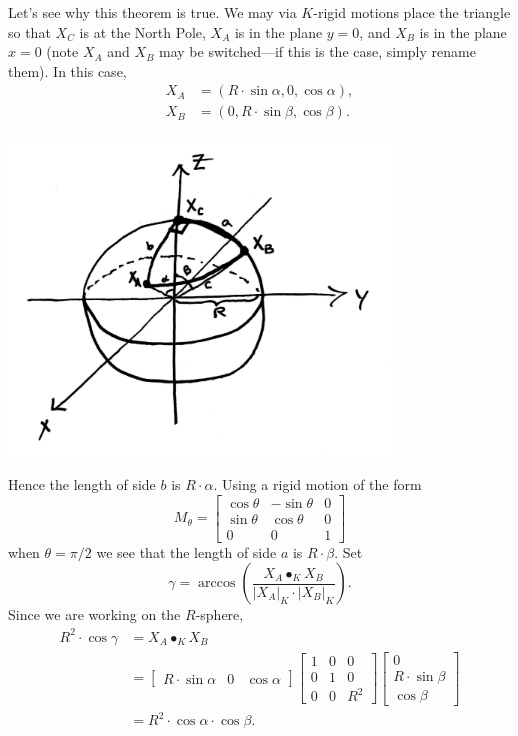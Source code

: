 \documentclass[newpage,hints,handout]{ximera}
\begin{document}
Let's see why this theorem is true.  We may via $K$-rigid motions
place the triangle so that $X_C$ is at the North Pole, $X_A$ is in the
plane $y=0$, and $X_B$ is in the plane $x=0$ (note $X_A$ and $X_B$ may
be switched---if this is the case, simply rename them). In this case,
\begin{align*}
  X_A &= (R\cdot \sin\alpha, 0, \cos\alpha),\\
  X_B &= (0, R\cdot \sin \beta, \cos\beta).
\end{align*}
\begin{image}
  \includegraphics[width=4in]{sphPythag.png}
\end{image}
Hence the length of side $b$ is $R\cdot\alpha$. Using a rigid motion of the form
\[
M_\theta=
\begin{bmatrix}
  \cos\theta & -\sin\theta & 0\\
  \sin\theta & \cos\theta & 0\\
  0 & 0 & 1
\end{bmatrix}
\]
when $\theta = \pi/2$ we see that the length of side $a$ is $R\cdot
\beta$. Set
\[
\gamma = \arccos\left(\frac{X_A\bullet_K X_B}{|X_A|_K\cdot |X_B|_K}\right).
\]
Since we are working on the $R$-sphere,
\begin{align*}
  R^2\cdot \cos \gamma &= X_A\bullet_K X_B\\
  &=
  \begin{bmatrix}
    R\cdot \sin\alpha &  0 & \cos\alpha
  \end{bmatrix}
    \begin{bmatrix}
      1 & 0 & 0\\
      0 & 1 & 0\\
      0 & 0 & R^2
    \end{bmatrix}
    \begin{bmatrix}
      0\\
      R\cdot\sin\beta\\
      \cos\beta
    \end{bmatrix}\\
   &=R^2 \cdot \cos\alpha \cdot \cos\beta.
  \end{align*}
\end{document}
